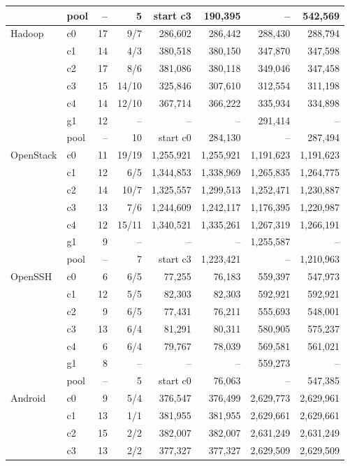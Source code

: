 \begin{longtable}{llrrrrrr}
 & pool & -- & 5 & start c3 & 190,395 & -- & 542,569 \\
\midrule
Hadoop & c0 & 17 & 9/7 & 286,602 & 286,442 & 288,430 & 288,794 \\
 & c1 & 14 & 4/3 & 380,518 & 380,150 & 347,870 & 347,598 \\
 & c2 & 17 & 8/6 & 381,086 & 380,118 & 349,046 & 347,458 \\
 & c3 & 15 & 14/10 & 325,846 & 307,610 & 312,554 & 311,198 \\
 & c4 & 14 & 12/10 & 367,714 & 366,222 & 335,934 & 334,898 \\
 & g1 & 12 & -- & -- & -- & 291,414 & -- \\
 & pool & -- & 10 & start c0 & 284,130 & -- & 287,494 \\
\midrule
OpenStack & c0 & 11 & 19/19 & 1,255,921 & 1,255,921 & 1,191,623 & 1,191,623 \\
 & c1 & 12 & 6/5 & 1,344,853 & 1,338,969 & 1,265,835 & 1,264,775 \\
 & c2 & 14 & 10/7 & 1,325,557 & 1,299,513 & 1,252,471 & 1,230,887 \\
 & c3 & 13 & 7/6 & 1,244,609 & 1,242,117 & 1,176,395 & 1,220,987 \\
 & c4 & 12 & 15/11 & 1,340,521 & 1,335,261 & 1,267,319 & 1,266,191 \\
 & g1 & 9 & -- & -- & -- & 1,255,587 & -- \\
 & pool & -- & 7 & start c3 & 1,223,421 & -- & 1,210,963 \\
\midrule
OpenSSH & c0 & 6 & 6/5 & 77,255 & 76,183 & 559,397 & 547,973 \\
 & c1 & 12 & 5/5 & 82,303 & 82,303 & 592,921 & 592,921 \\
 & c2 & 9 & 6/5 & 77,431 & 76,211 & 555,693 & 548,001 \\
 & c3 & 13 & 6/4 & 81,291 & 80,311 & 580,905 & 575,237 \\
 & c4 & 6 & 6/4 & 79,767 & 78,039 & 569,581 & 561,021 \\
 & g1 & 8 & -- & -- & -- & 559,273 & -- \\
 & pool & -- & 5 & start c0 & 76,063 & -- & 547,385 \\
\midrule
Android & c0 & 9 & 5/4 & 376,547 & 376,499 & 2,629,773 & 2,629,961 \\
 & c1 & 13 & 1/1 & 381,955 & 381,955 & 2,629,661 & 2,629,661 \\
 & c2 & 15 & 2/2 & 382,007 & 382,007 & 2,631,249 & 2,631,249 \\
 & c3 & 13 & 2/2 & 377,327 & 377,327 & 2,629,509 & 2,629,509 \\

\end{longtable}
